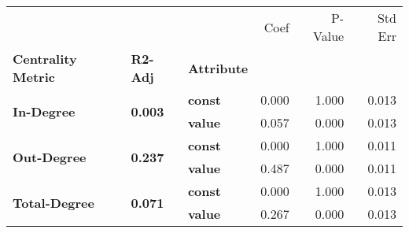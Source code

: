 \begin{tabular}{lllrrr}
\toprule
             &       &       &  Coef &  P-Value &  Std Err \\
\textbf{Centrality Metric} & \textbf{R2-Adj} & \textbf{Attribute} &       &          &          \\
\midrule
\multirow{2}{*}{\textbf{In-Degree}} & \multirow{2}{*}{\textbf{0.003}} & \textbf{const} & 0.000 &    1.000 &    0.013 \\
             &       & \textbf{value} & 0.057 &    0.000 &    0.013 \\
\cline{1-6}
\cline{2-6}
\multirow{2}{*}{\textbf{Out-Degree}} & \multirow{2}{*}{\textbf{0.237}} & \textbf{const} & 0.000 &    1.000 &    0.011 \\
             &       & \textbf{value} & 0.487 &    0.000 &    0.011 \\
\cline{1-6}
\cline{2-6}
\multirow{2}{*}{\textbf{Total-Degree}} & \multirow{2}{*}{\textbf{0.071}} & \textbf{const} & 0.000 &    1.000 &    0.013 \\
             &       & \textbf{value} & 0.267 &    0.000 &    0.013 \\
\bottomrule
\end{tabular}
